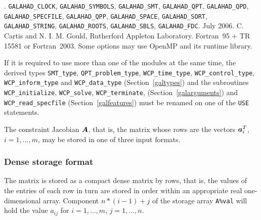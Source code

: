 \documentclass{galahad}
\newcommand{\packagename}{WCP}
\newcommand{\fullpackagename}{\libraryname\_\-\packagename}
\begin{document}

\galattributes
\galversions{\tt  \fullpackagename\_single, \fullpackagename\_double}.
\galuses 
{\tt GALAHAD\_\-CLOCK},
{\tt GALAHAD\_SY\-M\-BOLS}, 
{\tt GALAHAD\_SMT},
{\tt GALAHAD\_QPT}, {\tt GALAHAD\_QPD}, {\tt GALAHAD\_SPECFILE}, 
{\tt GALAHAD\_QPP}, {\tt GALAHAD\_SPACE}, {\tt GALAHAD\_\-SORT}, 
{\tt GALAHAD\_STRING}, {\tt GALAHAD\_\-ROOTS}, {\tt GALAHAD\_\-SBLS},
{\tt GALAHAD\_FDC}.
\galdate July 2006.
\galorigin C. Cartis and N. I. M. Gould, Rutherford Appleton Laboratory.
\gallanguage Fortran~95 + TR 15581 or Fortran~2003. 
\galparallelism Some options may use OpenMP and its runtime library.


\galhowto




\noindent
If it is required to use more than one of the modules at the same time, 
the derived types
{\tt SMT\_type}, 
{\tt QPT\_problem\_type}, 
{\tt \packagename\_time\_type}, 
{\tt \packagename\_control\_type}, 
{\tt \packagename\_inform\_type} 
and
{\tt \packagename\_data\_type}
(Section~\ref{galtypes})
and the subroutines
{\tt \packagename\_initialize}, 
{\tt \packagename\_\-solve},
{\tt \packagename\_terminate},
(Section~\ref{galarguments})
and 
{\tt \packagename\_read\_specfile}
(Section~\ref{galfeatures})
must be renamed on one of the {\tt USE} statements.


\galmatrix
The constraint Jacobian ${\bm{A}}$, that is, the matrix 
whose rows are the vectors ${\bm{a}}_{i}^{T}$, $i = 1, \ldots , m$, 
may be stored in one of three input formats.

\subsubsection{Dense storage format}\label{dense}
The matrix is stored as a compact 
dense matrix by rows, that is, the values of the entries of each row in turn are
stored in order within an appropriate real one-dimensional array.
Component $n \ast (i-1) + j$ of the storage array {\tt A\%val} will hold the 
value $a_{ij}$ for $i = 1, \ldots , m$, $j = 1, \ldots , n$.
\end{document}
